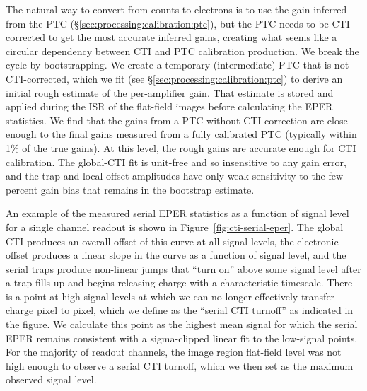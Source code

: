 The natural way to convert from counts to electrons is to use the gain inferred from the PTC (\S\ref{sec:processing:calibration:ptc}), but the PTC needs to be CTI-corrected to get the most accurate inferred gains, creating what seems like a circular dependency between CTI and PTC calibration production.
We break the cycle by bootstrapping. We create a temporary (intermediate) PTC that is not CTI-corrected, which we fit (see \S\ref{sec:processing:calibration:ptc}) to derive an initial rough estimate of the per-amplifier gain.
That estimate is stored and applied during the ISR of the flat-field images before calculating the EPER statistics.
We find that the gains from a PTC without CTI correction are close enough to the final gains measured from a fully calibrated PTC (typically within 1\% of the true gains).
At this level, the rough gains are accurate enough for CTI calibration. The global-CTI fit is unit-free and so insensitive to any gain error, and the trap and local-offset amplitudes have only weak sensitivity to the few-percent gain bias that remains in the bootstrap estimate.

An example of the measured serial EPER statistics as a function of signal level for a single channel readout is shown in Figure~\ref{fig:cti-serial-eper}.
The global CTI produces an overall offset of this curve at all signal levels, the electronic offset produces a linear slope in the curve as a function of signal level, and the serial traps produce non-linear jumps that ``turn on'' above some signal level after a trap fills up and begins releasing charge with a characteristic timescale.
There is a point at high signal levels at which we can no longer effectively transfer charge pixel to pixel, which we define as the ``serial CTI turnoff'' as indicated in the figure.
We calculate this point as the highest mean signal for which the serial EPER remains consistent with a sigma-clipped linear fit to the low-signal points. For the majority of readout channels, the image region flat-field level was not high enough to observe a serial CTI turnoff, which we then set as the maximum observed signal level.

